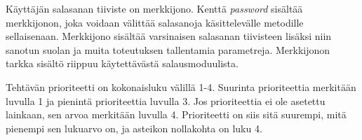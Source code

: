 \documentclass[12pt,a4paper,oneside,titlepage,pdftex]{article}
\begin{document}
\begin{table}[htbp]
\renewcommand{\arraystretch}{1.2}
\caption{Järjestelmän tietokohteiden kuvaukset}
\end{table}

Käyttäjän salasanan tiiviste on merkkijono. Kenttä \emph{password} sisältää merkkijonon, joka voidaan välittää salasanoja käsittelevälle metodille sellaisenaan. Merkkijono sisältää varsinaisen salasanan tiivisteen lisäksi niin sanotun suolan ja muita toteutuksen tallentamia parametreja. Merkkijonon tarkka sisältö riippuu käytettävästä salausmoduulista.

Tehtävän prioriteetti on kokonaisluku välillä 1-4. Suurinta prioriteettia merkitään luvulla 1 ja pienintä prioriteettia luvulla 3. Jos prioriteettia ei ole asetettu lainkaan, sen arvoa merkitään luvulla 4. Prioriteetti on siis sitä suurempi, mitä pienempi sen lukuarvo on, ja asteikon nollakohta on luku 4.
\end{document}
